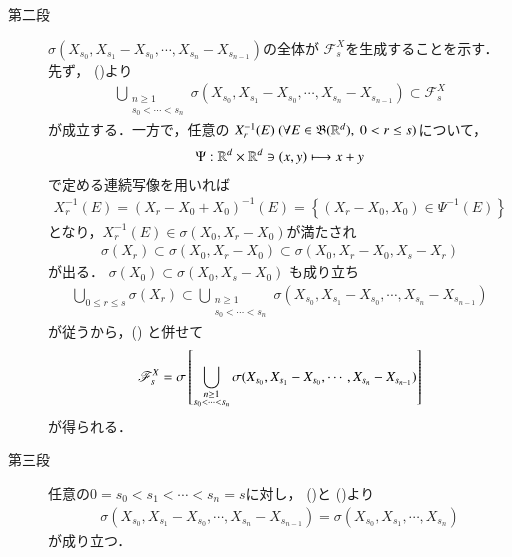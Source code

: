 \begin{prf}
\begin{description}
		\item[第二段]
			$\sigma(X_{s_0},X_{s_1}-X_{s_0},\cdots,X_{s_n} - X_{s_{n-1}})$の全体が
			$\mathscr{F}^X_s$を生成することを示す．先ず，
			()より
			\begin{align}
				\bigcup_{\substack{n \geq 1 \\ s_0 < \cdots < s_n}} 
				\sigma(X_{s_0},X_{s_1}-X_{s_0},\cdots,X_{s_n} - X_{s_{n-1}})
				\subset \mathscr{F}^X_s
				\label{eq:thm_application_dynkin_system_theorem_to_independence_3}
			\end{align}
			が成立する．一方で，任意の
			$X_r^{-1}(E)\ (\forall E \in \mathfrak{B}(\mathbb{R}^d),\ 0 < r \leq s)$について，
			\begin{align}
				\Psi:\mathbb{R}^d \times \mathbb{R}^d \ni (x,y) \longmapsto x + y
			\end{align}
			で定める連続写像を用いれば
			\begin{align}
				X_r^{-1}(E)
				= \left( X_r - X_0 + X_0 \right)^{-1}(E)
				= \left\{\left( X_r - X_0, X_0\right) \in \Psi^{-1}(E) \right\}
			\end{align}
			となり，$X_r^{-1}(E) \in \sigma(X_0, X_r - X_0)$が満たされ
			\begin{align}
				\sigma(X_r) \subset \sigma(X_0, X_r - X_0)
				\subset \sigma(X_0, X_r - X_0,X_s - X_r)
				\label{eq:thm_application_dynkin_system_theorem_to_independence_4}
			\end{align}
			が出る．
			$\sigma(X_0) \subset \sigma(X_0,X_s - X_0)$
			も成り立ち
			\begin{align}
				\bigcup_{0 \leq r \leq s} \sigma(X_r) \subset 
				\bigcup_{\substack{n \geq 1 \\ s_0 < \cdots < s_n}} \sigma(X_{s_0},X_{s_1}-X_{s_0},\cdots,X_{s_n} - X_{s_{n-1}})
			\end{align}
			が従うから，()
			と併せて
			\begin{align}
				\mathscr{F}^X_s
				= \sigma \left[\bigcup_{\substack{n \geq 1 \\ s_0 < \cdots < s_n}} \sigma(X_{s_0},X_{s_1}-X_{s_0},\cdots,X_{s_n} - X_{s_{n-1}})\right]
				\label{eq:thm_application_dynkin_system_theorem_to_independence_5}
			\end{align}
			が得られる．
		
		\item[第三段]
			任意の$0 = s_0 < s_1 < \cdots < s_n = s$に対し，
			()と
			()より
			\begin{align}
				\sigma(X_{s_0},X_{s_1}-X_{s_0},\cdots,X_{s_n} - X_{s_{n-1}})
				= \sigma(X_{s_0},X_{s_1},\cdots,X_{s_n})
				\label{eq:thm_application_dynkin_system_theorem_to_independence_6}
			\end{align}
			が成り立つ．
		

\end{description}
\end{prf}
